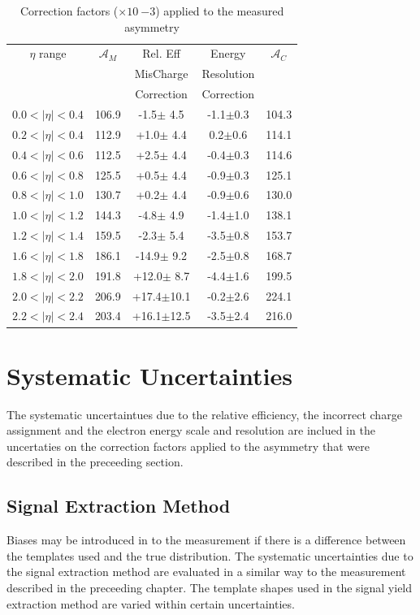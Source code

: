 \begin{table}[htbp]
  \begin{center}
    \begin{tabular}{ccccc}
\toprule
$\eta$ range & $\mathcal{A}_M$ & Rel. Eff & Energy & $\mathcal{A}_C$ \\
& & MisCharge & Resolution &  \\
& & Correction  & Correction & \\
\midrule
 $0.0<|\eta|<0.4$ & 106.9 &-1.5$\pm$ 4.5 & -1.1$\pm$0.3 & 104.3\\ 
 $0.2<|\eta|<0.4$ & 112.9 &+1.0$\pm$ 4.4 &  0.2$\pm$0.6 & 114.1\\ 
 $0.4<|\eta|<0.6$ & 112.5 &+2.5$\pm$ 4.4 & -0.4$\pm$0.3 & 114.6\\
 $0.6<|\eta|<0.8$ & 125.5 &+0.5$\pm$ 4.4 & -0.9$\pm$0.3 & 125.1\\ 
 $0.8<|\eta|<1.0$ & 130.7 &+0.2$\pm$ 4.4 & -0.9$\pm$0.6 & 130.0\\ 
 $1.0<|\eta|<1.2$ & 144.3 &-4.8$\pm$ 4.9 & -1.4$\pm$1.0 & 138.1\\ 
 $1.2<|\eta|<1.4$ & 159.5 &-2.3$\pm$ 5.4 & -3.5$\pm$0.8 & 153.7\\ 
 $1.6<|\eta|<1.8$ & 186.1 &-14.9$\pm$ 9.2 & -2.5$\pm$0.8 & 168.7\\
 $1.8<|\eta|<2.0$ & 191.8 &+12.0$\pm$ 8.7 & -4.4$\pm$1.6 & 199.5\\
 $2.0<|\eta|<2.2$ & 206.9 &+17.4$\pm$10.1&  -0.2$\pm$2.6 & 224.1\\
 $2.2<|\eta|<2.4$ & 203.4 &+16.1$\pm$12.5 & -3.5$\pm$2.4 & 216.0\\
\bottomrule
    \end{tabular}
    \caption{\label{tab:correctionfactors}Correction factors ($\times 10~{-3}$) applied to the measured asymmetry}
  \end{center}
\end{table}


\section{Systematic Uncertainties}
The systematic uncertaintues due to the relative efficiency, the incorrect
charge assignment and the electron energy scale and resolution are inclued in
the uncertaties on the correction factors applied to the asymmetry that were
described in the preceeding section.

\subsection{Signal Extraction Method}
Biases may be introduced in to the measurement if there is a
difference between the \ETm templates used and the true \ETm distribution. 
The systematic uncertainties due to the signal extraction method are evaluated
in a similar way to the measurement described in the preceeding chapter.  The
template shapes used in the signal yield extraction method are varied within
certain uncertainties. 

